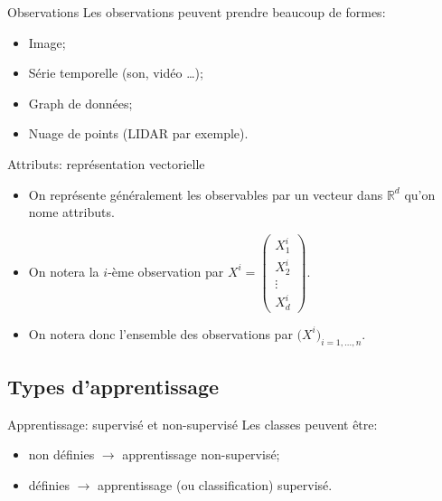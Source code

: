 \documentclass[8pt]{beamer}
\begin{document}
			\begin{frame}{Observations}
				Les observations peuvent prendre beaucoup de formes:
				\begin{itemize}
					\item<2-> Image;
					\item<3-> Série temporelle (son, vidéo \dots);
					\item<4-> Graph de données;
					\item<5-> Nuage de points (LIDAR par exemple).
				\end{itemize}
			\end{frame}

			\begin{frame}{Attributs: représentation vectorielle}
				\begin{itemize}
					\item<1-> On représente généralement les observables par un vecteur dans \(\mathbb{R}^d\) qu'on nome attributs.
					\item<2-> On notera la \(i\)-ème observation par \(X^i = \begin{pmatrix}
						X^i_1\\
						X^i_2\\
						\vdots\\
						X^i_d
					\end{pmatrix}\).
					\item<3-> On notera donc l'ensemble des observations par \(\big( X^i \big)_{i=1,\dots, n}\).
				\end{itemize}
			\end{frame}

		\subsection{Types d'apprentissage}
			\begin{frame}{Apprentissage: supervisé et non-supervisé}
				Les classes peuvent être:
				\begin{itemize}
					\item<2-> non définies \(\longrightarrow\) apprentissage non-supervisé;
					\item<3-> définies \(\longrightarrow\) apprentissage (ou classification) supervisé.
				\end{itemize}
			\end{frame}
\end{document}

